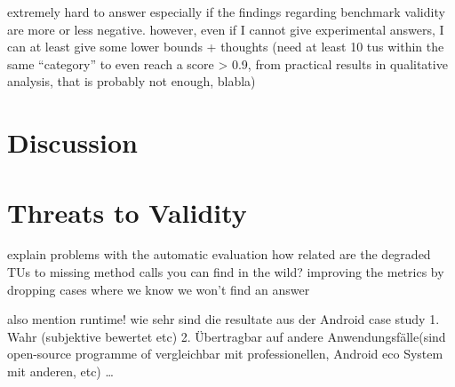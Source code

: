 extremely hard to answer especially if the findings regarding benchmark validity are more or less negative.
however, even if I cannot give experimental answers, I can at least give some lower bounds + thoughts
(need at least 10 tus within the same ``category'' to even reach a score > 0.9, from practical results in qualitative analysis, that is probably not enough, blabla)

\section{Discussion}

\section{Threats to Validity}

explain problems with the automatic evaluation
how related are the degraded TUs to missing method calls you can find in the wild?
improving the metrics by dropping cases where we know we won't find an answer

also mention runtime!
wie sehr sind die resultate aus der Android case study 1. Wahr (subjektive bewertet etc) 2. Übertragbar auf andere Anwendungsfälle(sind open-source programme of vergleichbar mit professionellen, Android eco System mit anderen, etc)
\ldots
